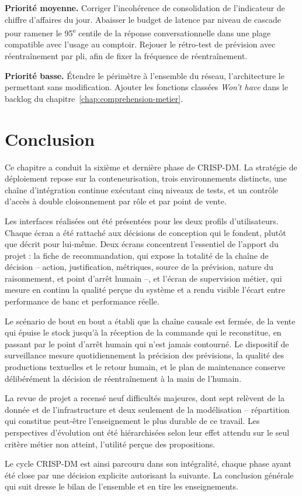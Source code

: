 \textbf{Priorité moyenne.} Corriger l'incohérence de consolidation de l'indicateur de chiffre d'affaires du jour. Abaisser le budget de latence par niveau de cascade pour ramener le 95\textsuperscript{e} centile de la réponse conversationnelle dans une plage compatible avec l'usage au comptoir. Rejouer le rétro-test de prévision avec réentraînement par pli, afin de fixer la fréquence de réentraînement.

\textbf{Priorité basse.} Étendre le périmètre à l'ensemble du réseau, l'architecture le permettant sans modification. Ajouter les fonctions classées \textit{Won't have} dans le backlog du chapitre~\ref{chap:comprehension-metier}.

\section*{Conclusion}

Ce chapitre a conduit la sixième et dernière phase de CRISP-DM. La stratégie de déploiement repose sur la conteneurisation, trois environnements distincts, une chaîne d'intégration continue exécutant cinq niveaux de tests, et un contrôle d'accès à double cloisonnement par rôle et par point de vente.

Les interfaces réalisées ont été présentées pour les deux profils d'utilisateurs. Chaque écran a été rattaché aux décisions de conception qui le fondent, plutôt que décrit pour lui-même. Deux écrans concentrent l'essentiel de l'apport du projet : la fiche de recommandation, qui expose la totalité de la chaîne de décision -- action, justification, métriques, source de la prévision, nature du raisonnement, et point d'arrêt humain --, et l'écran de supervision métier, qui mesure en continu la qualité perçue du système et a rendu visible l'écart entre performance de banc et performance réelle.

Le scénario de bout en bout a établi que la chaîne causale est fermée, de la vente qui épuise le stock jusqu'à la réception de la commande qui le reconstitue, en passant par le point d'arrêt humain qui n'est jamais contourné. Le dispositif de surveillance mesure quotidiennement la précision des prévisions, la qualité des productions textuelles et le retour humain, et le plan de maintenance conserve délibérément la décision de réentraînement à la main de l'humain.

La revue de projet a recensé neuf difficultés majeures, dont sept relèvent de la donnée et de l'infrastructure et deux seulement de la modélisation -- répartition qui constitue peut-être l'enseignement le plus durable de ce travail. Les perspectives d'évolution ont été hiérarchisées selon leur effet attendu sur le seul critère métier non atteint, l'utilité perçue des propositions.

Le cycle CRISP-DM est ainsi parcouru dans son intégralité, chaque phase ayant été close par une décision explicite autorisant la suivante. La conclusion générale qui suit dresse le bilan de l'ensemble et en tire les enseignements.

